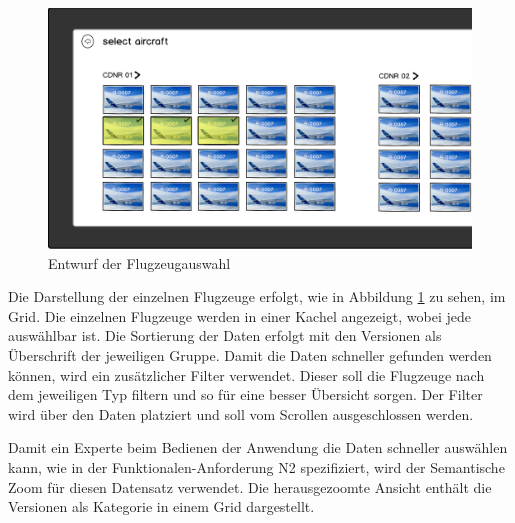 \begin{figure}
\centering
\includegraphics[width=\hsize]{images/version_entwurf}
\caption{Entwurf der Flugzeugauswahl}
\label{aircraftSketch}
\end{figure}
Die Darstellung der einzelnen Flugzeuge erfolgt, wie in Abbildung \ref{aircraftSketch} zu sehen, im Grid. Die einzelnen Flugzeuge werden in einer Kachel angezeigt, wobei jede auswählbar ist. Die Sortierung der Daten erfolgt mit den Versionen als Überschrift der jeweiligen Gruppe. Damit die Daten schneller gefunden werden können, wird ein zusätzlicher Filter verwendet. Dieser soll die Flugzeuge nach dem jeweiligen Typ filtern und so für eine besser Übersicht sorgen. Der Filter wird über den Daten platziert und soll vom Scrollen ausgeschlossen werden. \par 

Damit ein Experte beim Bedienen der Anwendung die Daten schneller auswählen kann, wie in der Funktionalen-Anforderung N2 spezifiziert, wird der Semantische Zoom für diesen Datensatz verwendet. Die herausgezoomte Ansicht enthält die Versionen als Kategorie in einem Grid dargestellt. 

